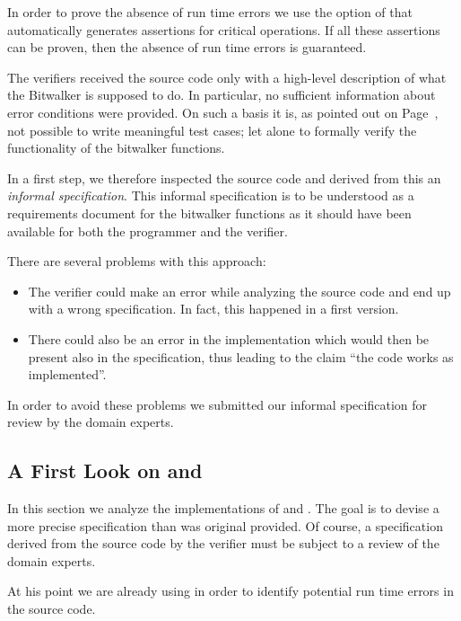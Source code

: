 In order to prove the absence of run time errors we use
the  option of \wpframac that automatically generates \acsl
assertions for critical operations.
If all these assertions can be proven, then
the absence of run time errors is guaranteed.


\begin{framed}
The verifiers received the source code only with a high-level description
of what the Bitwalker is supposed to do.
In particular, no sufficient information about error conditions were provided.
On such a basis it is, as pointed out on Page~\pageref{lesson},
not possible to write meaningful test cases;
let alone to formally verify the functionality of the bitwalker functions.

In a first step, we therefore inspected the source code and 
derived from this an \emph{informal specification}.
This informal specification is to be understood
as a requirements document for the bitwalker functions as it should have been
available for both the programmer and the verifier.

There are several problems with this approach:
\begin{itemize}
\item
The verifier could make an error while analyzing the source code
and end up with a wrong specification. 
In fact, this happened in a first version.

\item
There could also be an error in the implementation which would then be present also
in the specification, thus leading to the claim ``the code works as implemented''.
\end{itemize}

In order to avoid these problems we submitted our informal specification
for review by the domain experts.
\end{framed}

\clearpage

\subsection{A First Look on \peek and \poke}

In this section we analyze the implementations of \peek 
and \poke.
The goal is to devise a more precise specification than
was original provided.
Of course, a specification derived from the source code by the verifier
must be subject to a review of the domain experts.

At his point we are already using \framacwp in order to identify
potential run time errors in the source code.

